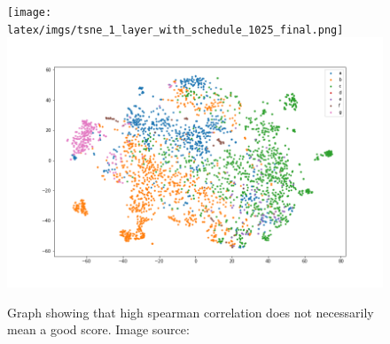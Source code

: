 \begin{figure}[!ht]
  \centering
  \texttt{[image: latex/imgs/tsne\_1\_layer\_with\_schedule\_1025\_final.png]}
  \includegraphics[width=0.4\linewidth]{latex/imgs/tsne_1_layer_with_schedule_1024_minloss.png}
  \caption{Graph showing that high spearman correlation does not necessarily mean a good score. Image source:\cite{spearman}}
\end{figure}



